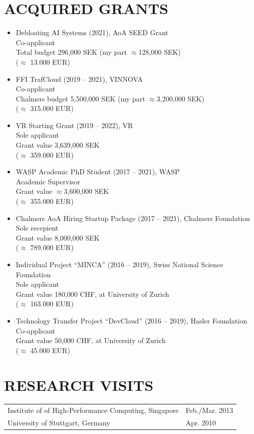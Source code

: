 \documentclass[paper=letter,fontsize=11pt]{scrartcl} %
\newcommand{\NewPart}[2]{\section*{\uppercase{#1} #2}}
\begin{document}
\newpage

\NewPart{Acquired Grants}{}

\begin{itemize}
        \item Debloating AI Systems (2021), AoA SEED Grant\\
        Co-applicant\\
        Total budget 296,000 SEK (my part $\approx$128,000 SEK)\\
        ($\approx$ 13.000 EUR)
	\item FFI TrafCloud (2019 -- 2021), VINNOVA\\
	Co-applicant\\
	Chalmers budget 5,500,000 SEK (my part $\approx$3,200,000 SEK)\\
  ($\approx$ 315.000 EUR)
  \item VR Starting Grant (2019 -- 2022), VR\\
  Sole applicant\\
	Grant value 3,639,000 SEK\\
  ($\approx$ 359.000 EUR)
  \item WASP Academic PhD Student (2017 -- 2021), WASP\\
  Academic Supervisor\\
	Grant value $\approx$3,600,000 SEK\\
  ($\approx$ 355.000 EUR)
  \item Chalmers AoA Hiring Startup Package (2017 -- 2021), Chalmers Foundation\\
	Sole recepient\\
  Grant value 8,000,000 SEK\\
  ($\approx$ 789.000 EUR)
  \item Individual Project ``MINCA'' (2016 -- 2019), Swiss National Science Foundation\\
  Sole applicant \\
  Grant value 180,000 CHF, at University of Zurich\\
  ($\approx$ 163.000 EUR)
  \item Technology Transfer Project ``DevCloud'' (2016 -- 2019), Hasler Foundation\\
  Co-applicant \\
  Grant value 50,000 CHF, at University of Zurich\\
  ($\approx$ 45.000 EUR)
\end{itemize}

\NewPart{Research Visits}{}

  \begin{tabular}{p{12cm}l}
    Institute of of High-Performance Computing, Singapore & Feb./Mar. 2013 \\
    University of Stuttgart, Germany & Apr. 2010 \\
  \end{tabular}
\end{document}
